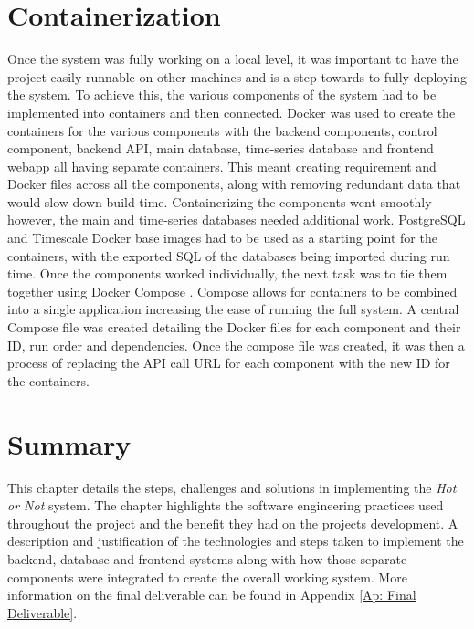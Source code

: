     \section{Containerization}
    Once the system was fully working on a local level, it was important to have the project easily runnable on other machines and is a step towards to fully deploying the system. To achieve this, the various components of the system had to be implemented into containers and then connected. Docker \cite{merkel2014docker} was used to create the containers for the various components with the backend components, control component, backend API, main database, time-series database and frontend webapp all having separate containers. This meant creating requirement and Docker files across all the components, along with removing redundant data that would slow down build time. Containerizing the components went smoothly however, the main and time-series databases needed additional work. PostgreSQL and Timescale Docker base images had to be used as a starting point for the containers, with the exported SQL of the databases being imported during run time. Once the components worked individually, the next task was to tie them together using Docker Compose \citep{Jangla_2018}. Compose allows for containers to be combined into a single application increasing the ease of running the full system. A central Compose file was created detailing the Docker files for each component and their ID, run order and dependencies. Once the compose file was created, it was then a process of replacing the API call URL for each component with the new ID for the containers. 
            
    \section{Summary}
    This chapter details the steps, challenges and solutions in implementing the \textit{Hot or Not} system. The chapter highlights the software engineering practices used throughout the project and the benefit they had on the projects development. A description and justification of the technologies and steps taken to implement the backend, database and frontend systems along with how those separate components were integrated to create the overall working system. More information on the final deliverable can be found in Appendix \ref{Ap: Final Deliverable}.
    
    
    